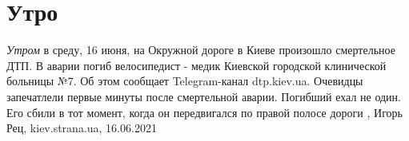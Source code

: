  
 
 
 
 
\chapter{Утро}
\label{sec:slova.utro}

\emph{Утром} в среду, 16 июня, на Окружной дороге в Киеве произошло смертельное ДТП. В
аварии погиб велосипедист - медик Киевской городской клинической больницы №7.
Об этом сообщает Telegram-канал dtp.kiev.ua.  Очевидцы запечатлели первые
минуты после смертельной аварии. Погибший ехал не один. Его сбили в тот момент,
когда он передвигался по правой полосе дороги
,
Игорь Рец, kiev.strana.ua, 16.06.2021

